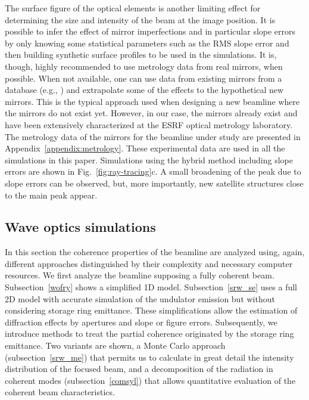 \documentclass{iucr}              %
\begin{document}
The surface figure of the optical elements is another limiting effect for determining the size and intensity of the beam at the image position. It is possible to infer the effect of mirror imperfections and in particular slope errors by only knowing some statistical parameters such as the RMS slope error and then building synthetic surface profiles to be used in the simulations. It is, though, highly recommended to use metrology data from real mirrors, when possible. When not available, one can use data from existing mirrors from a database (e.g., \cite{dabam}) and extrapolate some of the effects to the hypothetical new mirrors. This is the typical approach used when designing a new beamline where the mirrors do not exist yet. However, in our case, the mirrors already exist and have been extensively characterized at the ESRF optical metrology laboratory.  The metrology data of the mirrors for the beamline under study are presented in Appendix~\ref{appendix:metrology}. These experimental data are used in all the simulations in this paper. Simulations using the hybrid method including slope errors are shown in Fig.~\ref{fig:ray-tracing}c. A small broadening of the peak due to slope errors can be observed, but, more importantly, new satellite structures close to the main peak appear. 


% 

\subsection{Wave optics simulations}
\label{level2}

In this section the coherence properties of the beamline are analyzed using, again, different approaches distinguished by their complexity and necessary computer resources. We first analyze the beamline supposing a fully coherent beam. Subsection~\ref{wofry} shows a simplified 1D model. Subsection~\ref{srw_se} uses a full 2D model with accurate simulation of the undulator emission but without considering storage ring emittance. These simplifications allow the estimation of diffraction effects by apertures and slope or figure errors. Subsequently, we introduce methods to treat the partial coherence originated by the storage ring emittance. Two variants are shown, a Monte Carlo approach (subsection~\ref{srw_me}) that permits us to calculate in great detail the intensity distribution of the focused beam, and a decomposition of the radiation in coherent modes (subsection~\ref{comsyl}) that allows quantitative evaluation of the coherent beam characteristics.  
\end{document}
